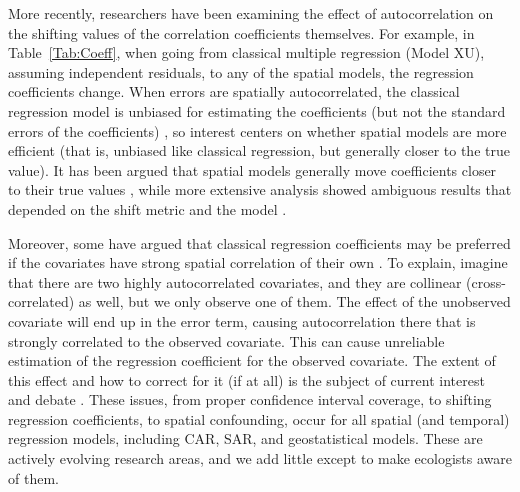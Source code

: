 \documentclass[11pt, titlepage]{article}\usepackage[]{graphicx}\usepackage[]{color}
\begin{document}
\begin{spacing}{1.9}
\begin{flushleft}
More recently, researchers have been examining the effect of autocorrelation on the shifting values of the correlation coefficients themselves.  For example, in Table~\ref{Tab:Coeff}, when going from classical multiple regression (Model XU), assuming independent residuals, to any of the spatial models, the regression coefficients change.  When errors are spatially autocorrelated, the classical regression model is unbiased for estimating the coefficients (but not the standard errors of the coefficients) \citep{Cres:stat:1993,Scha:Gotw:stat:2005,Hawk:Dini:Bini:DeMa:Blac:red:2007,Dorm:Effe:2007}, so interest centers on whether spatial models are more efficient (that is, unbiased like classical regression, but generally closer to the true value). It has been argued that spatial models generally move coefficients closer to their true values \citep[e.g.,][]{Ver:Cres:spat:1993,Kuhn:inco:2007,Dorm:Effe:2007}, while more extensive analysis showed ambiguous results that depended on the shift metric and the model \citep{Bini:Dini:Rang:Thia:coef:2009}.  

Moreover, some have argued that classical regression coefficients may be preferred if the covariates have strong spatial correlation of their own \citep[a topic called spatial confounding,][]{Clay:Bern:Mont:spat:1993,Reic:Hodg:Zadn:effe:2006}.  To explain, imagine that there are two highly autocorrelated covariates, and they are collinear (cross-correlated) as well, but we only observe one of them.  The effect of the unobserved covariate will end up in the error term, causing autocorrelation there that is strongly correlated to the observed covariate.  This can cause unreliable estimation of the regression coefficient for the observed covariate.  The extent of this effect and how to correct for it (if at all) is the subject of current interest and debate \citep[e.g.,][]{Hodg:Reic:addi:2010,Paci:impo:2010,Hugh:Hara:dime:2013,Hank:Schl:Hoot:Hoet:rest:2015}.  These issues, from proper confidence interval coverage, to shifting regression coefficients, to spatial confounding, occur for all spatial (and temporal) regression models, including CAR, SAR, and geostatistical models.  These are actively evolving research areas, and we add little except to make ecologists aware of them.  


\end{flushleft}
\end{spacing}
\end{document}
